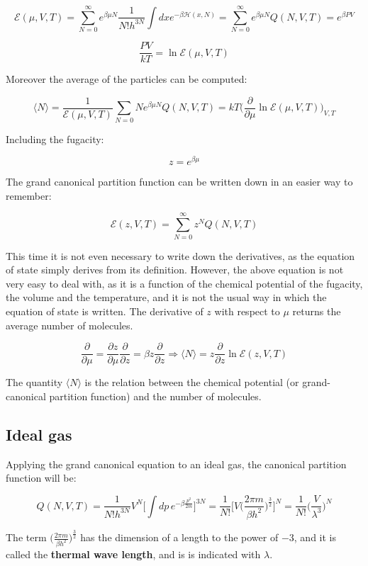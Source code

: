 	$$\mathcal{E}(\mu, V, T) = \sum\limits_{N=0}^{\infty}e^{\beta\mu N}\frac{1}{N!h^{3N}}\int dxe^{-\beta\mathcal{H}(x, N)} = \sum\limits_{N=0}^{\infty}e^{\beta\mu N}Q(N, V, T) = e^{\beta PV}$$

	$$\frac{PV}{kT} = \ln\mathcal{E}(\mu, V, T)$$

	Moreover the average of the particles can be computed:

	$$\langle N\rangle = \frac{1}{\mathcal{E}(\mu, V, T)}\sum\limits_{N=0}Ne^{\beta\mu N}Q(N, V, T) = kT\biggl(\frac{\partial}{\partial\mu}\ln\mathcal{E}(\mu, V, T)\biggr)_{V, T}$$

	Including the fugacity:

	$$z = e^{\beta\mu}$$

	The grand canonical partition function can be written down in an easier way to remember:

	$$\mathcal{E}(z, V, T) = \sum\limits_{N=0}^{\infty}z^NQ(N, V, T)$$

	This time it is not even necessary to write down the derivatives, as the equation of state simply derives from its definition.
	However, the above equation is not very easy to deal with, as it is a function of the chemical potential of the fugacity, the volume and the temperature, and it is not the usual way in which the equation of state is written.
	The derivative of $z$ with respect to $\mu$ returns the average number of molecules.

	$$\frac{\partial}{\partial\mu} = \frac{\partial z}{\partial\mu}\frac{\partial}{\partial z} = \beta z\frac{\partial}{\partial z}\Rightarrow\langle N\rangle = z\frac{\partial}{\partial z}\ln\mathcal{E}(z, V, T)$$

	The quantity $\langle N\rangle$ is the relation between the chemical potential (or grand-canonical partition function) and the number of molecules.

	\subsection{Ideal gas}
	Applying the grand canonical equation to an ideal gas, the canonical partition function will be:

	$$Q(N, V, T) = \frac{1}{N!h^{3N}}V^N\biggl[\int dp \, e^{-\beta\frac{p^2}{2m}}\biggr]^{3N} = \frac{1}{N!}\biggl[V\biggl(\frac{2\pi m}{\beta h^2}\biggr)^{\frac{3}{2}}\biggr]^{N} = \frac{1}{N!}\biggl(\frac{V}{\lambda^3}\biggr)^N$$

	The term $(\frac{2\pi m}{\beta h^2}\biggr)^{\frac{3}{2}}$ has the dimension of a length to the power of $-3$, and it is called the \textbf{thermal wave length}, and is is indicated with $\lambda$.

